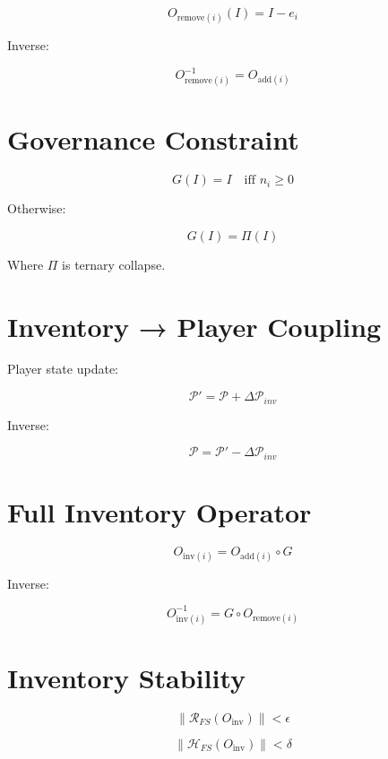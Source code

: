 \[
O_{\text{remove}(i)}(I)
= I - e_i
\]

Inverse:

\[
O_{\text{remove}(i)}^{-1}
= O_{\text{add}(i)}
\]


\section*{Governance Constraint}

\[
G(I) = I
\quad \text{iff } n_i \ge 0
\]

Otherwise:

\[
G(I) = \Pi(I)
\]

Where \(\Pi\) is ternary collapse.


\section*{Inventory → Player Coupling}

Player state update:

\[
\mathcal{P}' = \mathcal{P} + \Delta\mathcal{P}_{inv}
\]

Inverse:

\[
\mathcal{P} = \mathcal{P}' - \Delta\mathcal{P}_{inv}
\]


\section*{Full Inventory Operator}

\[
O_{\text{inv}(i)}
= O_{\text{add}(i)} \circ G
\]

Inverse:

\[
O_{\text{inv}(i)}^{-1}
= G \circ O_{\text{remove}(i)}
\]


\section*{Inventory Stability}

\[
\|\mathcal{R}_{FS}(O_{\text{inv}})\| < \epsilon
\]

\[
\|\mathcal{H}_{FS}(O_{\text{inv}})\| < \delta
\]

